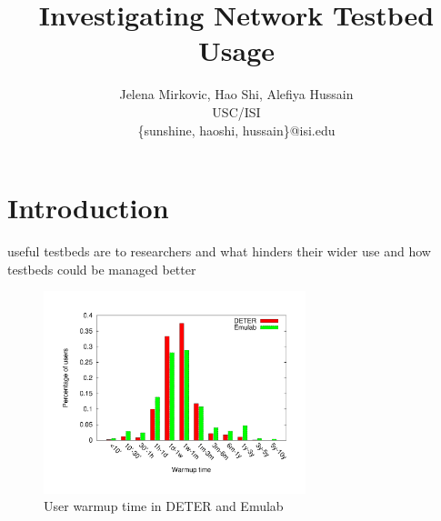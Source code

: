 \documentclass[10pt, twocolumn]{article} %
\begin{document}
\normalsize 


\clearpage {}

\title{Investigating Network Testbed Usage} \author{Jelena Mirkovic, Hao
Shi, Alefiya Hussain\\ USC/ISI\\ \{sunshine, haoshi, hussain\}@isi.edu }

\maketitle \begin{abstract} \end{abstract} \section{Introduction}

useful testbeds are to researchers and what hinders their wider use
and how testbeds could be managed better %






\begin{figure}[htbp] \begin{center}
\includegraphics[width=3in]{figs/warmup_user.pdf} \caption{User warmup
time in DETER and Emulab} \label{warmupus} \end{center} \end{figure}
\end{document}
